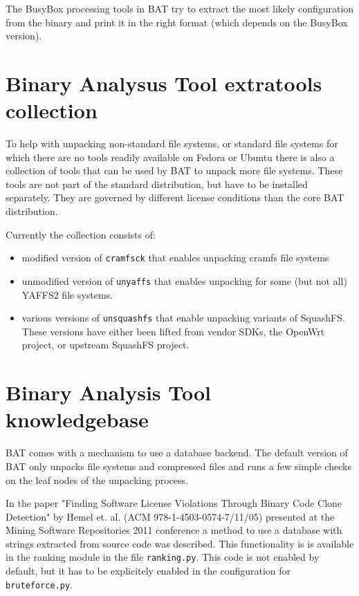 \documentclass[10pt]{article}
\begin{document}
The BusyBox processing tools in BAT try to extract the most likely
configuration from the binary and print it in the right format (which
depends on the BusyBox version).

\section{Binary Analysus Tool extratools collection}

To help with unpacking non-standard file systems, or standard file systems for
which there are no tools readily available on Fedora or Ubuntu there is also
a collection of tools that can be used by BAT to unpack more file systems.
These tools are not part of the standard distribution, but have to be installed
separately. They are governed by different license conditions than the core BAT
distribution.

Currently the collection consists of:

\begin{itemize}
\item modified version of \texttt{cramfsck} that enables unpacking cramfs
file systems
\item unmodified version of \texttt{unyaffs} that enables unpacking for some
(but not all) YAFFS2 file systems.
\item various versions of \texttt{unsquashfs} that enable unpacking variants
of SquashFS. These versions have either been lifted from vendor SDKs, the
OpenWrt project, or upstream SquashFS project.
\end{itemize}

\section{Binary Analysis Tool knowledgebase}

BAT comes with a mechanism to use a database backend. The default version of
BAT only unpacks file systems and compressed files and runs a few simple checks
on the leaf nodes of the unpacking process.

In the paper "Finding Software License Violations Through Binary Code Clone
Detection" by Hemel et. al. (ACM 978-1-4503-0574-7/11/05) presented at
the Mining Software Repositories 2011 conference a method to use a database
with strings extracted from source code was described. This functionality is
is available in the ranking module in the file \texttt{ranking.py}. This code
is not enabled by default, but it has to be explicitely enabled in the
configuration for \texttt{bruteforce.py}.
\end{document}
